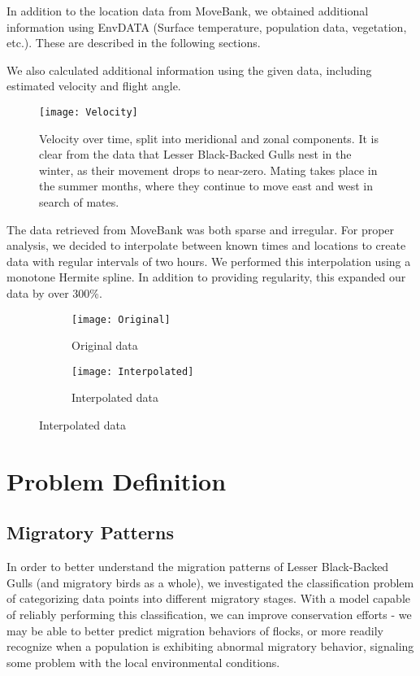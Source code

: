 \documentclass[letterpaper, 10pt, conference]{ieeeconf}  %
\begin{document}
    In addition to the location data from MoveBank, we obtained additional information using EnvDATA \cite{envdata} (Surface temperature, population data, vegetation, etc.). These are described in the following sections.
  	
    We also calculated additional information using the given data, including estimated velocity and flight angle.
    
	\begin{figure}[h!]
	\centering
	\texttt{[image: Velocity]}
	\caption{Velocity over time, split into meridional and zonal components. It is clear from the data that Lesser Black-Backed Gulls nest in the winter, as their movement drops to near-zero. Mating takes place in the summer months, where they continue to move east and west in search of mates.}
    \label{fig:vel}
	\end{figure}
    
    The data retrieved from MoveBank was both sparse and irregular. For proper analysis, we decided to interpolate between known times and locations to create data with regular intervals of two hours. We performed this interpolation using a monotone Hermite spline. In addition to providing regularity, this expanded our data by over 300\%. 
    
	\begin{figure}[h!]
	\centering
    \begin{subfigure}{0.5\columnwidth}
    	\texttt{[image: Original]}
        \caption{Original data}
    \end{subfigure}%
    \begin{subfigure}{0.5\columnwidth}
    	\texttt{[image: Interpolated]}
    	\caption{Interpolated data}
	\end{subfigure}
	\end{figure}
    
\section{Problem Definition} \label{probdef}
\subsection{Migratory Patterns}
	In order to better understand the migration patterns of Lesser Black-Backed Gulls (and migratory birds as a whole), we investigated the classification problem of categorizing data points into different migratory stages. With a model capable of reliably performing this classification, we can improve conservation efforts - we may be able to better predict migration behaviors of flocks, or more readily recognize when a population is exhibiting abnormal migratory behavior, signaling some problem with the local environmental conditions.
    
\end{document}
